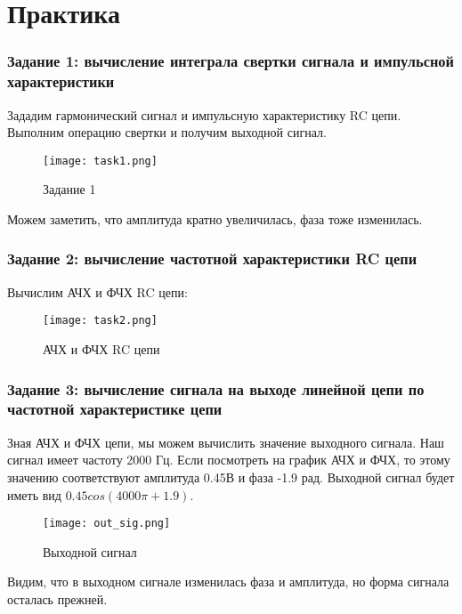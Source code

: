 \chapter{Практика}
\label{ch:chap2}

\subsection*{Задание 1: вычисление интеграла свертки сигнала и импульсной характеристики}

Зададим гармонический сигнал и импульсную характеристику RC цепи. Выполним операцию свертки и получим выходной сигнал.

\begin{figure}[H]
    \centering
    \texttt{[image: task1.png]}
    \caption{Задание 1}
\end{figure}

Можем заметить, что амплитуда кратно увеличилась, фаза тоже изменилась.

\subsection*{Задание 2: вычисление частотной характеристики RC цепи}

Вычислим АЧХ и ФЧХ RC цепи:

\begin{figure}[H]
    \centering
    \texttt{[image: task2.png]}
    \caption{АЧХ и ФЧХ RC цепи}
\end{figure}

\subsection*{Задание 3: вычисление сигнала на выходе линейной цепи по частотной характеристике цепи}

Зная АЧХ и ФЧХ цепи, мы можем вычислить значение выходного сигнала. Наш сигнал имеет частоту 2000 Гц. Если посмотреть на график
АЧХ и ФЧХ, то этому значению соответствуют амплитуда 0.45В и фаза -1.9 рад. Выходной сигнал будет иметь вид $0.45cos(4000\pi+1.9)$. 

\begin{figure}[H]
    \centering
    \texttt{[image: out\_sig.png]}
    \caption{Выходной сигнал}
\end{figure}

Видим, что в выходном сигнале изменилась фаза и амплитуда, но форма сигнала осталась прежней.

\endinput